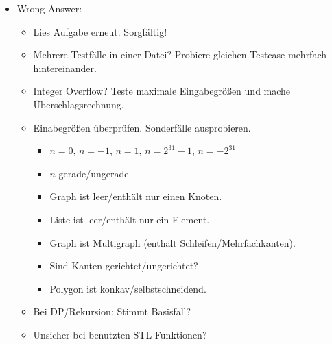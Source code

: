 \begin{itemize}
	\item Wrong Answer:
	\begin{itemize}
		\item Lies Aufgabe erneut. Sorgfältig!
		\item Mehrere Testfälle in einer Datei? Probiere gleichen Testcase mehrfach hintereinander.
		\item Integer Overflow? Teste maximale Eingabegrößen und mache Überschlagsrechnung.
		\item Einabegrößen überprüfen. Sonderfälle ausprobieren.
		\begin{itemize}
			\item $n = 0$, $n = -1$, $n = 1$, $n = 2^{31}-1$, $n = -2^{31}$
			\item $n$ gerade/ungerade
			\item Graph ist leer/enthält nur einen Knoten.
			\item Liste ist leer/enthält nur ein Element.
			\item Graph ist Multigraph (enthält Schleifen/Mehrfachkanten).
			\item Sind Kanten gerichtet/ungerichtet?
			\item Polygon ist konkav/selbstschneidend.
		\end{itemize}
		\item Bei DP/Rekursion: Stimmt Basisfall?
		\item Unsicher bei benutzten STL-Funktionen?
	\end{itemize}
\end{itemize}
